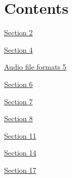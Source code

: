 \documentclass[
]{article}
\author{}
\date{}
\begin{document}
\hypertarget{contents}{%
\section{Contents}\label{contents}}

\protect\hyperlink{_Toc57651147}{Section
\protect\hyperlink{_Toc57651147}{2}}

\protect\hyperlink{_Toc57651148}{Section
\protect\hyperlink{_Toc57651148}{4}}

\protect\hyperlink{_Toc57651149}{Audio file formats
\protect\hyperlink{_Toc57651149}{5}}

\protect\hyperlink{_Toc57651150}{Section
\protect\hyperlink{_Toc57651150}{6}}

\protect\hyperlink{_Toc57651151}{Section
\protect\hyperlink{_Toc57651151}{7}}

\protect\hyperlink{_Toc57651152}{Section
\protect\hyperlink{_Toc57651152}{8}}

\protect\hyperlink{_Toc57651153}{Section
\protect\hyperlink{_Toc57651153}{11}}

\protect\hyperlink{_Toc57651154}{Section
\protect\hyperlink{_Toc57651154}{14}}

\protect\hyperlink{_Toc57651155}{Section
\protect\hyperlink{_Toc57651155}{17}}

\textbf{\hfill\break
}

\hypertarget{section}{%
\section{}\label{section}}
\end{document}

